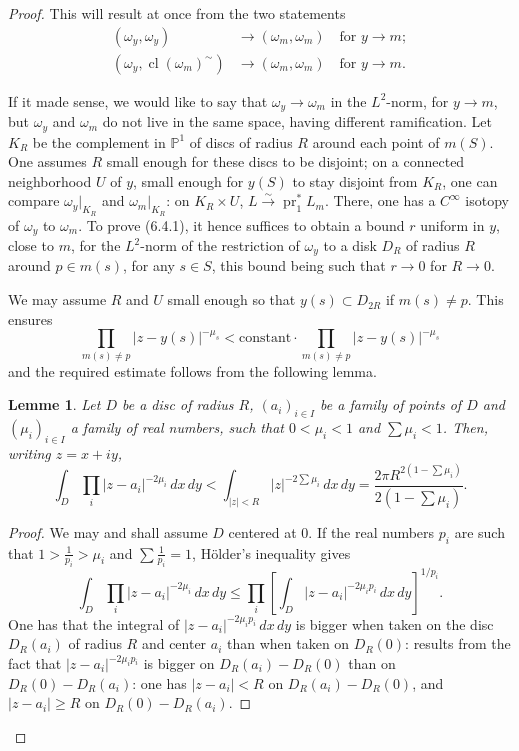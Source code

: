 \documentclass[12pt,a4paper]{article}
\theoremstyle{plain}
\newtheorem{lemma}[theorem]{Lemme}
\theoremstyle{definition}
\theoremstyle{remark}
\newcommand{\PP}{\mathbb{P}}
\numberwithin{equation}{section}
\providecommand{\PP}{\mathbb{P}}
\providecommand{\pr}{\operatorname{pr}}
\providecommand{\cl}{\operatorname{cl}}
\begin{document}
\begin{proof}
This will result at once from the two statements
\begin{align}
(\omega_y, \omega_y) &\to (\omega_m, \omega_m) \quad \text{for } y \to m; \label{eq:6.4.1} \\
(\omega_y, \cl(\omega_m)^\sim) &\to (\omega_m, \omega_m) \quad \text{for } y \to m. \label{eq:6.4.2}
\end{align}

If it made sense, we would like to say that $\omega_y \to \omega_m$ in the $L^2$-norm, for $y \to m$, but $\omega_y$ and $\omega_m$ do not live in the same space, having different ramification. Let $K_R$ be the complement in $\PP^1$ of discs of radius $R$ around each point of $m(S)$. One assumes $R$ small enough for these discs to be disjoint; on a connected neighborhood $U$ of $y$, small enough for $y(S)$ to stay disjoint from $K_R$, one can compare $\omega_y|_{K_R}$ and $\omega_m|_{K_R}$: on $K_R \times U$, $L \xrightarrow{\sim} \pr_1^* L_m$. There, one has a $C^\infty$ isotopy of $\omega_y$ to $\omega_m$. To prove (6.4.1), it hence suffices to obtain a bound $r$ uniform in $y$, close to $m$, for the $L^2$-norm of the restriction of $\omega_y$ to a disk $D_R$ of radius $R$ around $p \in m(s)$, for any $s \in S$, this bound being such that $r \to 0$ for $R \to 0$.

We may assume $R$ and $U$ small enough so that $y(s) \subset D_{2R}$ if $m(s) \neq p$. This ensures
\[
\prod_{m(s) \neq p} |z - y(s)|^{-\mu_s} < \text{constant} \cdot \prod_{m(s) \neq p} |z - y(s)|^{-\mu_s}
\]
and the required estimate follows from the following lemma.

\begin{lemma}\label{lem:6.5}
Let $D$ be a disc of radius $R$, $(a_i)_{i \in I}$ be a family of points of $D$ and $(\mu_i)_{i \in I}$ a family of real numbers, such that $0 < \mu_i < 1$ and $\sum \mu_i < 1$. Then, writing $z = x + iy$,
\[
\int_D \prod_i |z - a_i|^{-2\mu_i} \, dx \, dy < \int_{|z| < R} |z|^{-2\sum \mu_i} \, dx \, dy = \frac{2\pi R^{2(1 - \sum \mu_i)}}{2(1 - \sum \mu_i)}.
\]
\end{lemma}

\begin{proof}
We may and shall assume $D$ centered at $0$. If the real numbers $p_i$ are such that $1 > \frac{1}{p_i} > \mu_i$ and $\sum \frac{1}{p_i} = 1$, H\"older's inequality gives
\[
\int_D \prod_i |z - a_i|^{-2\mu_i} \, dx \, dy \leq \prod_i \left[ \int_D |z - a_i|^{-2\mu_i p_i} \, dx \, dy \right]^{1/p_i}.
\]
One has that the integral of $|z - a_i|^{-2\mu_i p_i} \, dx \, dy$ is bigger when taken on the disc $D_R(a_i)$ of radius $R$ and center $a_i$ than when taken on $D_R(0)$: results from the fact that $|z - a_i|^{-2\mu_i p_i}$ is bigger on $D_R(a_i) - D_R(0)$ than on $D_R(0) - D_R(a_i)$: one has $|z - a_i| < R$ on $D_R(a_i) - D_R(0)$, and $|z - a_i| \geq R$ on $D_R(0) - D_R(a_i)$.


\end{proof}
\end{proof}
\end{document}
